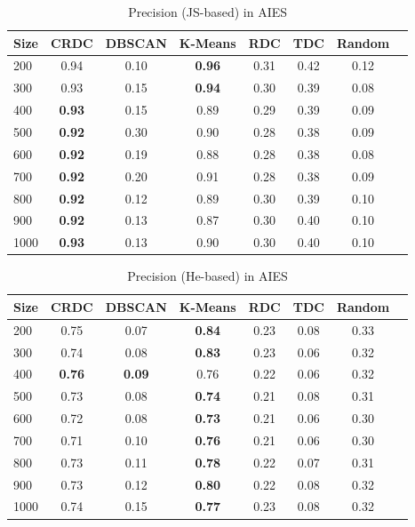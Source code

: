 \begin{table}[!htb]
    \centering
        \begin{tabular}{l*{6}{c}r}\hline
                    Size    & CRDC & DBSCAN & K-Means & RDC & TDC  & Random \\
          \hline
					200 & 0.94 & 0.10 & \textbf{0.96} & 0.31 & 0.42 & 0.12 \\
					300 & 0.93 & 0.15 & \textbf{0.94} & 0.30 & 0.39 & 0.08 \\
					400 & \textbf{0.93} & 0.15 & 0.89 & 0.29 & 0.39 & 0.09 \\
					500 & \textbf{0.92} & 0.30 & 0.90 & 0.28 & 0.38 & 0.09 \\
					600 & \textbf{0.92} & 0.19 & 0.88 & 0.28 & 0.38 & 0.08 \\
					700 & \textbf{0.92} & 0.20 & 0.91 & 0.28 & 0.38 & 0.09 \\
					800 & \textbf{0.92} & 0.12 & 0.89 & 0.30 & 0.39 & 0.10 \\
					900 & \textbf{0.92} & 0.13 & 0.87 & 0.30 & 0.40 & 0.10 \\
					1000 & \textbf{0.93} & 0.13 & 0.90 & 0.30 & 0.40 & 0.10 \\
        \end{tabular}
    \caption{Precision (JS-based) in AIES}\label{tab:precisionJS}
\end{table}

\begin{table}[!htb]
    \centering
        \begin{tabular}{l*{6}{c}r}\hline
                    Size  & CRDC & DBSCAN & K-Means & RDC & TDC  & Random \\
          \hline
					200 & 0.75 & 0.07 & \textbf{0.84} & 0.23 & 0.08 & 0.33 \\
					300 & 0.74 & 0.08 & \textbf{0.83} & 0.23 & 0.06 & 0.32 \\
					400 & \textbf{0.76} & \textbf{0.09} & 0.76 & 0.22 & 0.06 & 0.32 \\
					500 & 0.73 & 0.08 & \textbf{0.74} & 0.21 & 0.08 & 0.31 \\
					600 & 0.72 & 0.08 & \textbf{0.73} & 0.21 & 0.06 & 0.30 \\
					700 & 0.71 & 0.10 & \textbf{0.76} & 0.21 & 0.06 & 0.30 \\
					800 & 0.73 & 0.11 & \textbf{0.78} & 0.22 & 0.07 & 0.31 \\
					900 & 0.73 & 0.12 & \textbf{0.80} & 0.22 & 0.08 & 0.32 \\
					1000 & 0.74 & 0.15 & \textbf{0.77} & 0.23 & 0.08 & 0.32 \\
        \end{tabular}
    \caption{Precision (He-based) in AIES}\label{tab:precisionHe}
\end{table}

